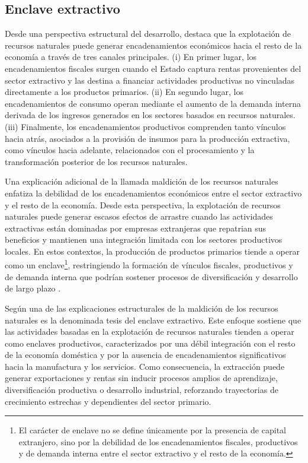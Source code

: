 \documentclass[../../PTFM.tex]{subfiles}
\begin{document}
	\subsection{Enclave extractivo}
	\label{subsec:enclave-extractivo}
	
	Desde una perspectiva estructural del desarrollo, \textcite{Hirschman1981} destaca que la explotación de recursos naturales puede generar encadenamientos económicos hacia el resto de la economía a través de tres canales principales. (i) En primer lugar, los encadenamientos fiscales surgen cuando el Estado captura rentas provenientes del sector extractivo y las destina a financiar actividades productivas no vinculadas directamente a los productos primarios. (ii) En segundo lugar, los encadenamientos de consumo operan mediante el aumento de la demanda interna derivada de los ingresos generados en los sectores basados en recursos naturales. (iii) Finalmente, los encadenamientos productivos comprenden tanto vínculos hacia atrás, asociados a la provisión de insumos para la producción extractiva, como vínculos hacia adelante, relacionados con el procesamiento y la transformación posterior de los recursos naturales.
	
	Una explicación adicional de la llamada maldición de los recursos naturales enfatiza la debilidad de los encadenamientos económicos entre el sector extractivo y el resto de la economía. Desde esta perspectiva, la explotación de recursos naturales puede generar escasos efectos de arrastre cuando las actividades extractivas están dominadas por empresas extranjeras que repatrian sus beneficios y mantienen una integración limitada con los sectores productivos locales. En estos contextos, la producción de productos primarios tiende a operar como un enclave\footnote{El carácter de enclave no se define únicamente por la presencia de capital extranjero, sino por la debilidad de los encadenamientos fiscales, productivos y de demanda interna entre el sector extractivo y el resto de la economía.}, restringiendo la formación de vínculos fiscales, productivos y de demanda interna que podrían sostener procesos de diversificación y desarrollo de largo plazo \parencite{Hirschman1958}.
	
	Según \textcite{Ross1999} una de las explicaciones estructurales de la maldición de los recursos naturales es la denominada tesis del enclave extractivo. Este enfoque sostiene que las actividades basadas en la explotación de recursos naturales tienden a operar como enclaves productivos, caracterizados por una débil integración con el resto de la economía doméstica y por la ausencia de encadenamientos significativos hacia la manufactura y los servicios. Como consecuencia, la extracción puede generar exportaciones y rentas sin inducir procesos amplios de aprendizaje, diversificación productiva o desarrollo industrial, reforzando trayectorias de crecimiento estrechas y dependientes del sector primario.
	
\end{document}
